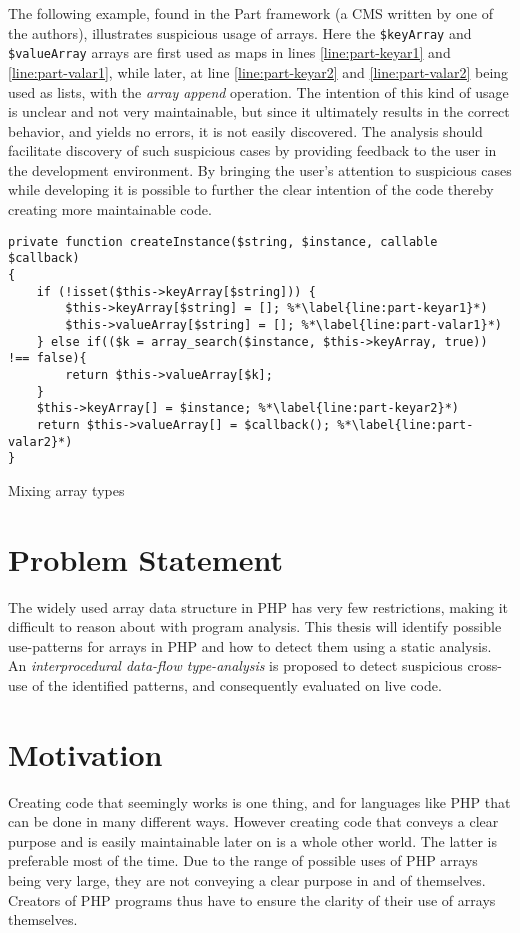The following example, found in the Part framework (a CMS written by one of the authors), illustrates suspicious usage of arrays. Here the \texttt{\$keyArray} and \texttt{\$valueArray} arrays are first used as maps in lines \ref{line:part-keyar1} and \ref{line:part-valar1}, while later, at line \ref{line:part-keyar2} and \ref{line:part-valar2} being used as lists, with the \emph{array append} operation. The intention of this kind of usage is unclear and not very maintainable, but since it ultimately results in the correct behavior, and yields no errors, it is not easily discovered. The analysis should facilitate discovery of such suspicious cases by providing feedback to the user in the development environment. By bringing the user's attention to suspicious cases while developing it is possible to further the clear intention of the code thereby creating more maintainable code.

\begin{program}
\centering 
\begin{lstlisting}
private function createInstance($string, $instance, callable $callback)
{
    if (!isset($this->keyArray[$string])) {
        $this->keyArray[$string] = []; %*\label{line:part-keyar1}*)
        $this->valueArray[$string] = []; %*\label{line:part-valar1}*)
    } else if(($k = array_search($instance, $this->keyArray, true)) !== false){
        return $this->valueArray[$k];
    }
    $this->keyArray[] = $instance; %*\label{line:part-keyar2}*)
    return $this->valueArray[] = $callback(); %*\label{line:part-valar2}*)
}
\end{lstlisting}
\caption{Mixing array types}
\end{program}

\section{Problem Statement}
The widely used array data structure in PHP has very few restrictions, making it difficult to reason about with program analysis. This thesis will identify possible use-patterns for arrays in PHP and how to detect them using a static analysis. An \emph{interprocedural data-flow type-analysis} is proposed to detect suspicious cross-use of the identified patterns, and consequently evaluated on live code.

\section{Motivation}
Creating code that seemingly works is one thing, and for languages like PHP that can be done in many different ways. However creating code that conveys a clear purpose and is easily maintainable later on is a whole other world. The latter is preferable most of the time. Due to the range of possible uses of PHP arrays being very large, they are not conveying a clear purpose in and of themselves. Creators of PHP programs thus have to ensure the clarity of their use of arrays themselves. 

